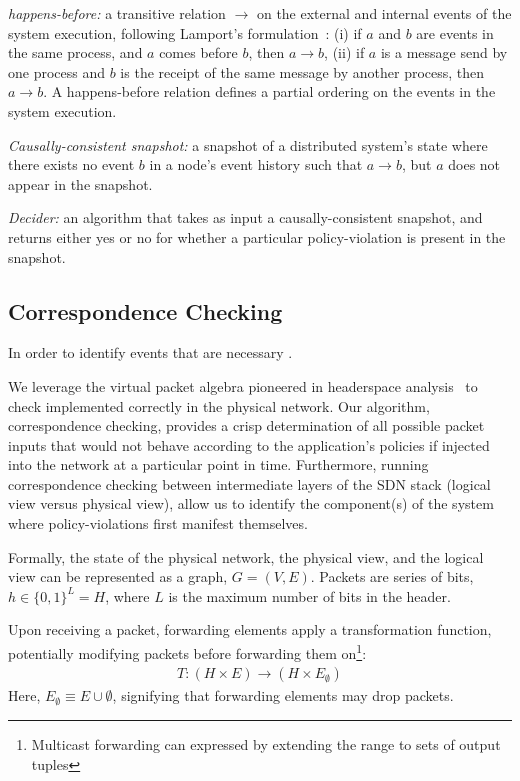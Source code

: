 {\em happens-before:} a transitive relation $\rightarrow$ on the external and internal events of
the system execution, following Lamport's
formulation~\cite{Lamport:1978:TCO:359545.359563}: (i) if $a$ and $b$ are
events in the same process, and $a$ comes before $b$, then $a \rightarrow b$,
(ii) if $a$ is a message send by one process and $b$ is the receipt of the
same message by another process, then $a \rightarrow b$. A happens-before
relation defines a partial ordering on the events in the system execution.

{\em Causally-consistent snapshot:} a snapshot of a distributed system's state where
there exists no event $b$ in a node's event history such that $a \rightarrow
b$, but $a$ does not appear in the snapshot.

{\em Decider:} an algorithm that takes as input a causally-consistent
snapshot, and returns either yes or no for whether a particular
policy-violation is present in the snapshot.

\subsection{Correspondence Checking}


In order to identify events that are necessary .

We leverage the virtual packet algebra pioneered in headerspace
analysis~\cite{hsa} to check 
implemented correctly in the physical network. Our algorithm, correspondence
checking, provides a crisp determination of all possible packet inputs that
would not behave according to the application's policies if injected into the
network at a particular point in time. Furthermore, running correspondence
checking between intermediate layers of the SDN stack (logical view versus
physical view), allow us to identify the component(s) of
the system where policy-violations first manifest themselves.

Formally, the state of the physical network, the physical view, and the
logical view can be represented as a graph,
$G = (V, E)$. Packets are series of bits, $h \in \{0,1\}^L = H$,
where $L$ is the maximum number of bits in the header.

Upon receiving a packet,
forwarding elements apply a transformation function, potentially modifying
packets before forwarding them on\footnote{Multicast forwarding can expressed
by extending the range to sets of output tuples}:
\begin{align*}
T: (H \times E) \rightarrow (H \times E_{\emptyset})
\end{align*}
Here, $E_{\emptyset} \equiv E \cup \emptyset$, signifying that forwarding elements
may drop packets.

